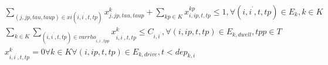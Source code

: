 \begin{align}
  & \underset{\left(j , jp , \mathit{tau} , taup\right) \in \mathit{xi} \left(i , i^{^{'}} , t , tp\right)}{\sum} x_{j , jp , \mathit{tau} , taup}^{k} + \sum_{kp \in K} x_{i , ip , t , tp}^{kp} \leq 1 , \forall \left(i , i^{^{'}} , t , tp\right) \in E_{k} , k \in K \tag{eq\_0050} \\
  & \sum_{k \in K} \underset{\left(i , i^{^{'}} , t , tp\right) \in \mathit{varrho}_{i , i^{^{'}} , tpp}}{\sum} x_{i , i^{^{'}} , t , tp}^{k} \leq C_{i , i^{^{'}}} , \forall \left(i , ip , t , tp\right) \in E_{k , d w e l l} , tpp \in T \tag{eq\_0051} \\
  & x_{i , i^{^{'}} , t , tp}^{k} = 0 \forall k \in K \forall \left(i , ip , t , tp\right) \in E_{k , d r i v e} , t < \mathit{dep}_{k , i} \tag{eq\_0052} \\
\end{align}

